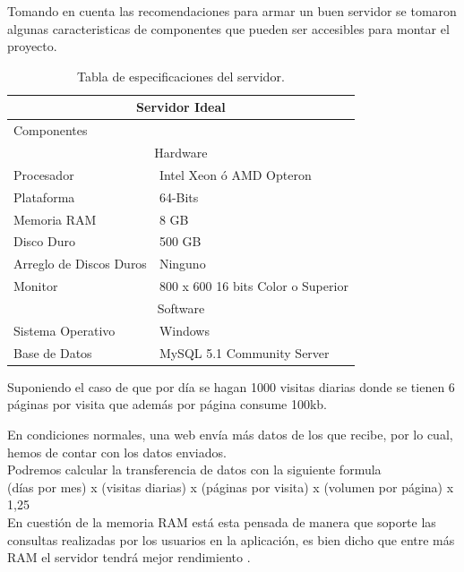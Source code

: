 	\noindent Tomando en cuenta las recomendaciones para armar un buen servidor se tomaron algunas caracteristicas de componentes que pueden ser accesibles para montar el proyecto. \cite{serv}\cite{servi}
	
	\begin{table}[htbp]
		\begin{center}
			\begin{tabular}{|l|l|}
				\hline
				\multicolumn{2}{|c|}{Servidor Ideal} \\
				\hline
				Componentes & \\
				\hline
				\multicolumn{2}{|c|}{Hardware} \\
				\hline
				Procesador & Intel Xeon ó AMD Opteron\\
				\hline
				Plataforma & 64-Bits\\
				\hline
				Memoria RAM & 8 GB\\
				\hline
				Disco Duro & 500 GB\\
				\hline
				Arreglo de Discos Duros & Ninguno\\
				\hline
				Monitor & 800 x 600 16 bits Color o Superior\\
				\hline
				\multicolumn{2}{|c|}{Software} \\
				\hline
				Sistema Operativo & Windows \\
				\hline
				Base de Datos & MySQL 5.1 Community Server\\
				\hline
			\end{tabular}
			\caption{Tabla de especificaciones del servidor.}
		\end{center}
	\end{table}
\pagebreak
\noindent Suponiendo el caso de que por día se hagan 1000 visitas diarias donde se tienen 6 páginas por visita que además por página consume 100kb.

\noindent En condiciones normales, una web envía más datos de los que recibe, por lo cual, hemos de contar con los datos enviados.
\\
\noindent Podremos calcular la transferencia de datos con la siguiente formula\\

(días por mes) x (visitas diarias) x (páginas por visita) x (volumen por página) x 1,25\\

\noindent En cuestión de la memoria RAM está esta pensada de manera que soporte las consultas realizadas por los usuarios en la aplicación, es bien dicho que entre más RAM el servidor tendrá mejor rendimiento \cite{servi}.

